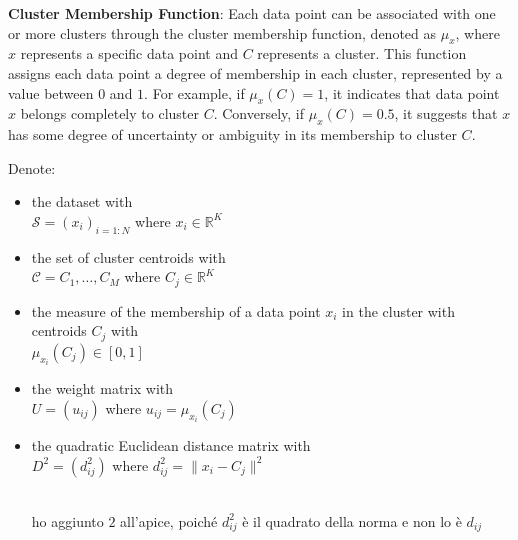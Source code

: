 \noindent \textbf{Cluster Membership Function}: Each data point can be associated with one or more clusters through the cluster membership function, denoted as $\mu_x$, where $x$ represents a specific data point and $C$ represents a cluster. This function assigns each data point a degree of membership in each cluster, represented by a value between $0$ and $1$. For example, if $\mu_x(C) = 1$, it indicates that data point $x$ belongs completely to cluster $C$. Conversely, if $\mu_x(C) = 0.5$, it suggests that $x$ has some degree of uncertainty or ambiguity in its membership to cluster $C$.
\begin{notation}
Denote:
\begin{itemize}
\item the dataset with \\ $\mathcal{S} = (x_i)_{i=1:N}$ where $x_i\in\mathbb{R}^K$
\item the set of cluster centroids with \\ $\mathcal{C}={C_1,\dots,C_M}$ where $C_j\in\mathbb{R}^K$
\item \begin{toReview}the measure of the membership of a data point $x_i$ in the cluster with centroids $C_j$ with \\ $\mu_{x_i}(C_j)\in\left[0,1\right]$
\end{toReview}
\item the weight matrix with \\ $U=(u_{ij})$ where $u_{ij}=\mu_{x_i}(C_j)$
\item the quadratic Euclidean distance matrix with \\ $D^2=(d^2_{ij})$ where $d_{ij}^2=\|x_i-C_j\|^2$
\begin{note}\\ho aggiunto $2$ all'apice, poiché $d_{ij}^2$ è il quadrato della norma e non lo è $d_{ij}$\end{note}
\end{itemize}
\end{notation}

